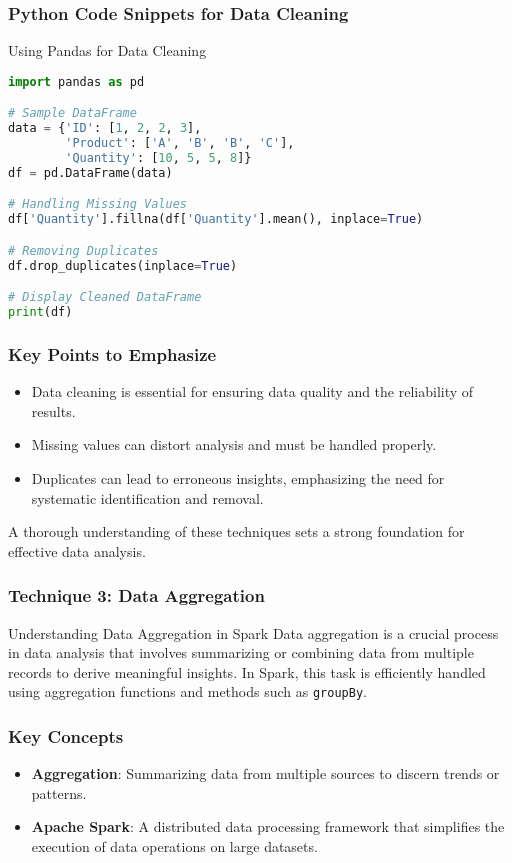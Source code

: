 \documentclass[aspectratio=169]{beamer}
\begin{document}
\begin{frame}[fragile]
    \frametitle{Python Code Snippets for Data Cleaning}
    \begin{block}{Using Pandas for Data Cleaning}
        \begin{lstlisting}[language=Python]
import pandas as pd

# Sample DataFrame
data = {'ID': [1, 2, 2, 3], 
        'Product': ['A', 'B', 'B', 'C'], 
        'Quantity': [10, 5, 5, 8]}
df = pd.DataFrame(data)

# Handling Missing Values
df['Quantity'].fillna(df['Quantity'].mean(), inplace=True)

# Removing Duplicates
df.drop_duplicates(inplace=True)

# Display Cleaned DataFrame
print(df)
        \end{lstlisting}
    \end{block}
\end{frame}

\begin{frame}[fragile]
    \frametitle{Key Points to Emphasize}
    \begin{itemize}
        \item Data cleaning is essential for ensuring data quality and the reliability of results.
        \item Missing values can distort analysis and must be handled properly.
        \item Duplicates can lead to erroneous insights, emphasizing the need for systematic identification and removal.
    \end{itemize}
    A thorough understanding of these techniques sets a strong foundation for effective data analysis.
\end{frame}

\begin{frame}
    \frametitle{Technique 3: Data Aggregation}
    \begin{block}{Understanding Data Aggregation in Spark}
        Data aggregation is a crucial process in data analysis that involves summarizing or combining data from multiple records to derive meaningful insights. In Spark, this task is efficiently handled using aggregation functions and methods such as \texttt{groupBy}.
    \end{block}
\end{frame}

\begin{frame}
    \frametitle{Key Concepts}
    \begin{itemize}
        \item \textbf{Aggregation}: Summarizing data from multiple sources to discern trends or patterns.
        \item \textbf{Apache Spark}: A distributed data processing framework that simplifies the execution of data operations on large datasets.
    \end{itemize}
\end{frame}
\end{document}
